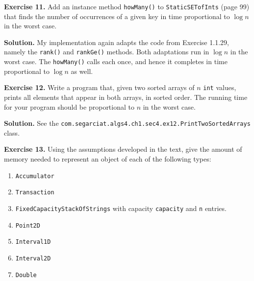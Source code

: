 \documentclass[12pt, a4paper]{article}
\newenvironment{ex}[2][Exercise]
{\par\medskip\noindent \textbf{#1 #2.}}
{\medskip}
\newenvironment{sol}[1][Solution]
{\par\medskip\noindent \textbf{#1.} }
{\medskip}
\begin{document}
	\begin{ex}{11}
		Add an instance method \texttt{howMany()} to \texttt{StaticSETofInts} (page 99)
		that finds the number of occurrences of a given key in time proportional to
		$\log n$ in the worst case.
	\end{ex}
	\begin{sol}
		My implementation again adapts the code from Exercise 1.1.29, namely the \texttt{rank()} and
		\texttt{rankGe()} methods. Both adaptations run in $\log n$ in the worst case.
		The \texttt{howMany()} calls each once, and hence it completes in time proportional to
		$\log n$ as well.
	\end{sol}
	\begin{ex}{12}
		Write a program that, given two sorted arrays of $n$ \texttt{int} values, prints all
		elements that appear in both arrays, in sorted order. The running time for your program
		should be proportional to $n$ in the worst case.
	\end{ex}
	\begin{sol}
		See the \texttt{com.segarciat.algs4.ch1.sec4.ex12.PrintTwoSortedArrays} class.
	\end{sol}
	\begin{ex}{13}
		Using the assumptions developed in the text, give the amount of memory needed to
		represent an object of each of the following types:
		\begin{enumerate}[label=(\alph*)]
			\item \texttt{Accumulator}
			\item \texttt{Transaction}
			\item \texttt{FixedCapacityStackOfStrings} with capacity \texttt{capacity}
			and \texttt{n} entries.
			\item \texttt{Point2D}
			\item \texttt{Interval1D}
			\item \texttt{Interval2D}
			\item \texttt{Double}
		\end{enumerate}
	\end{ex}
\end{document}
